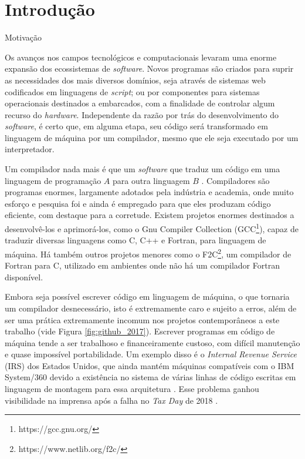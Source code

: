 \chapter{Introdução}
\label{cap:introducao}

\begin{subsection}{Motivação}

Os avanços nos campos tecnológicos e computacionais levaram uma enorme expansão
dos ecossistemas de \textit{software}. Novos programas são criados para
suprir as necessidades dos mais diversos domínios, seja através de sistemas web
codificados em linguagens de \textit{script}; ou por componentes para
sistemas operacionais destinados a embarcados, com a finalidade de controlar algum
recurso do \textit{hardware}. Independente da razão por trás do desenvolvimento
do \textit{software}, é certo que, em alguma etapa, seu código será transformado em linguagem
de máquina por um compilador, mesmo que ele seja executado por um
interpretador.

Um compilador nada mais é que um \textit{software} que traduz um código em uma linguagem
de programação $A$ para outra linguagem $B$ \citep{dragonbook}.  Compiladores
são programas enormes, largamente adotados pela indústria e academia, onde muito
esforço e pesquisa foi e ainda é empregado para que eles produzam código
eficiente, com destaque para a corretude. Existem projetos enormes destinados a desenvolvê-los e
aprimorá-los, como o Gnu Compiler Collection
(GCC\footnote{https://gcc.gnu.org/}), capaz de traduzir diversas linguagens
como C, C++ e Fortran, para linguagem de máquina. Há também outros projetos
menores como o F2C\footnote{https://www.netlib.org/f2c/}, um compilador de
Fortran para C, utilizado em ambientes onde não há um compilador Fortran
disponível.

Embora seja possível escrever código em linguagem de máquina, o que
tornaria um compilador desnecessário, isto é extremamente caro e
sujeito a erros, além de ser uma prática extremamente
incomum nos projetos contemporâneos a este trabalho \citep{githuboctoverse} (vide
Figura \ref{fig:github_2017}). Escrever programas em código de máquina tende a
ser trabalhoso e financeiramente custoso, com difícil manutenção e quase impossível portabilidade.
Um exemplo disso é o \textit{Internal Revenue Service} (IRS) dos Estados Unidos,
que ainda mantém máquinas compatíveis com o IBM System/360 devido a existência no sistema
de várias linhas de código escritas em linguagem de montagem para essa
arquitetura \citep{gao}. Esse problema ganhou visibilidade na imprensa após a falha no
\textit{Tax Day} de 2018 \citep{tax_failure}.


\end{subsection}
